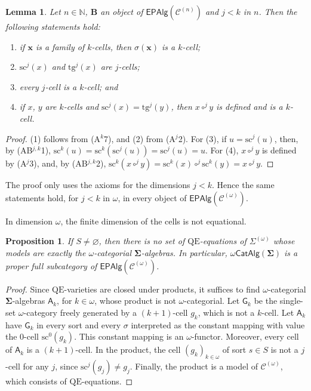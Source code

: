 \documentclass[a4paper,reqno]{amsart}
\newcommand{\sig}[1]{\mathbf{#1}}                %
\newcommand{\calg}[1]{\boldsymbol{\mathsf{#1}}}  %
\newcommand{\spec}[1]{\boldsymbol{\mathcal{#1}}} %
\newcommand{\QE}{\mathrm{QE}}
\newcommand{\src}{\mathrm{sc}}
\newcommand{\tgt}{\mathrm{tg}}
\newcommand{\EPAlg}{\mathsf{EPAlg}}
\theoremstyle{plain}
\newtheorem{proposition}[theorem]{Proposition}
\newtheorem{lemma}[theorem]{Lemma}
\theoremstyle{definition}
\begin{document}
\begin{lemma}\label{LGradCells}
Let $n\in\mathbb{N}$, $\mathbf{B}$ an object of $\EPAlg(\spec{C}^{(n)})$ and $j<k$ in $n$.
Then the following statements hold:
\begin{enumerate}
\item if $\mathbf{x}$ is a family of $k$-cells, then $\sigma(\mathbf{x})$ is a $k$-cell;
\item $\src^{j}(x)$ and $\tgt^{j}(x)$ are $j$-cells;
\item every $j$-cell is a $k$-cell; and
\item if $x$, $y$ are $k$-cells and $\src^{j}(x)=\tgt^{j}(y)$, then $x\circ^{j}y$ is defined and is a $k$-cell.
\end{enumerate}
\end{lemma}
\begin{proof}
(1) follows from (A$^{k}$7), and (2) from (A$^{j}$2).
For (3), if $u=\src^{j}(u)$, then, by (AB$^{j,k}$1), $\src^{k}(u)=\src^{k}(\src^{j}(u))=\src^{j}(u)=u$.
For (4), $x\circ^{j}y$ is defined by (A$^{j}$3), and, by (AB$^{j,k}$2), $\src^{k}(x\circ^{j}y)=\src^{k}(x)\circ^{j}\src^{k}(y)=x\circ^{j}y$.
\end{proof}

The proof only uses the axioms for the dimensions $j<k$.
Hence the same statements hold, for $j<k$ in $\omega$, in every object of $\EPAlg(\spec{C}^{(\omega)})$.

In dimension $\omega$, the finite dimension of the cells is not equational.

\begin{proposition}\label{PFiniteDimNotQE}
If $S\neq\varnothing$, then there is no set of $\QE$-equations of $\Sigma^{(\omega)}$ whose models are exactly the $\omega$-categorial $\sig{\Sigma}$-algebras.
In particular, $\omega\mathsf{CatAlg}(\sig{\Sigma})$ is a proper full subcategory of $\EPAlg(\spec{C}^{(\omega)})$.
\end{proposition}
\begin{proof}
Since $\QE$-varieties are closed under products, it suffices to find $\omega$-categorial $\sig{\Sigma}$-algebras $\calg{A}_{k}$, for $k\in\omega$, whose product is not $\omega$-categorial.
Let $\mathsf{G}_{k}$ be the single-set $\omega$-category freely generated by a $(k+1)$-cell $g_{k}$, which is not a $k$-cell.
Let $\calg{A}_{k}$ have $\mathsf{G}_{k}$ in every sort and every $\sigma$ interpreted as the constant mapping with value the $0$-cell $\src^{0}(g_{k})$.
This constant mapping is an $\omega$-functor.
Moreover, every cell of $\calg{A}_{k}$ is a $(k+1)$-cell.
In the product, the cell $(g_{k})_{k\in\omega}$ of sort $s\in S$ is not a $j$-cell for any $j$, since $\src^{j}(g_{j})\neq g_{j}$.
Finally, the product is a model of $\mathcal{C}^{(\omega)}$, which consists of $\QE$-equations.
\end{proof}
\end{document}
